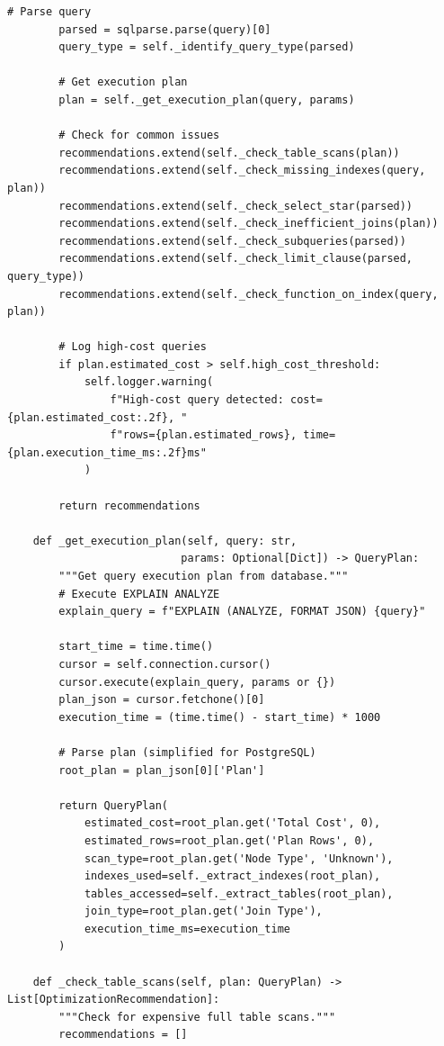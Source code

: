 \begin{lstlisting}[style=python, caption=QueryOptimizer with Cost-Based Analysis]
        # Parse query
        parsed = sqlparse.parse(query)[0]
        query_type = self._identify_query_type(parsed)

        # Get execution plan
        plan = self._get_execution_plan(query, params)

        # Check for common issues
        recommendations.extend(self._check_table_scans(plan))
        recommendations.extend(self._check_missing_indexes(query, plan))
        recommendations.extend(self._check_select_star(parsed))
        recommendations.extend(self._check_inefficient_joins(plan))
        recommendations.extend(self._check_subqueries(parsed))
        recommendations.extend(self._check_limit_clause(parsed, query_type))
        recommendations.extend(self._check_function_on_index(query, plan))

        # Log high-cost queries
        if plan.estimated_cost > self.high_cost_threshold:
            self.logger.warning(
                f"High-cost query detected: cost={plan.estimated_cost:.2f}, "
                f"rows={plan.estimated_rows}, time={plan.execution_time_ms:.2f}ms"
            )

        return recommendations

    def _get_execution_plan(self, query: str,
                           params: Optional[Dict]) -> QueryPlan:
        """Get query execution plan from database."""
        # Execute EXPLAIN ANALYZE
        explain_query = f"EXPLAIN (ANALYZE, FORMAT JSON) {query}"

        start_time = time.time()
        cursor = self.connection.cursor()
        cursor.execute(explain_query, params or {})
        plan_json = cursor.fetchone()[0]
        execution_time = (time.time() - start_time) * 1000

        # Parse plan (simplified for PostgreSQL)
        root_plan = plan_json[0]['Plan']

        return QueryPlan(
            estimated_cost=root_plan.get('Total Cost', 0),
            estimated_rows=root_plan.get('Plan Rows', 0),
            scan_type=root_plan.get('Node Type', 'Unknown'),
            indexes_used=self._extract_indexes(root_plan),
            tables_accessed=self._extract_tables(root_plan),
            join_type=root_plan.get('Join Type'),
            execution_time_ms=execution_time
        )

    def _check_table_scans(self, plan: QueryPlan) -> List[OptimizationRecommendation]:
        """Check for expensive full table scans."""
        recommendations = []


\end{lstlisting}
